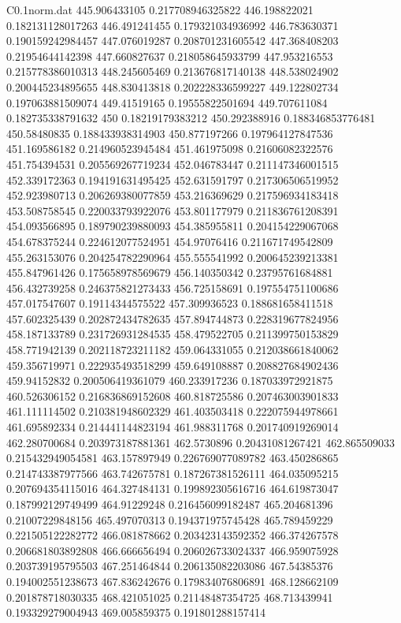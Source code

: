 \begin{filecontents}{C0.1norm.dat}
445.906433105		0.217708946325822
446.198822021		0.182131128017263
446.491241455		0.179321034936992
446.783630371		0.190159242984457
447.076019287		0.208701231605542
447.368408203		0.21954644142398
447.660827637		0.218058645933799
447.953216553		0.215778386010313
448.245605469		0.213676817140138
448.538024902		0.200445234895655
448.830413818		0.202228336599227
449.122802734		0.197063881509074
449.41519165		0.19555822501694
449.707611084		0.182735338791632
450		0.18219179383212
450.292388916		0.188346853776481
450.58480835		0.188433938314903
450.877197266		0.197964127847536
451.169586182		0.214960523945484
451.461975098		0.21606082322576
451.754394531		0.205569267719234
452.046783447		0.211147346001515
452.339172363		0.194191631495425
452.631591797		0.217306506519952
452.923980713		0.206269380077859
453.216369629		0.217596934183418
453.508758545		0.220033793922076
453.801177979		0.211836761208391
454.093566895		0.189790239880093
454.385955811		0.204154229067068
454.678375244		0.224612077524951
454.97076416		0.211671749542809
455.263153076		0.204254782290964
455.555541992		0.200645239213381
455.847961426		0.175658978569679
456.140350342		0.23795761684881
456.432739258		0.246375821273433
456.725158691		0.197554751100686
457.017547607		0.19114344575522
457.309936523		0.188681658411518
457.602325439		0.202872434782635
457.894744873		0.228319677824956
458.187133789		0.231726931284535
458.479522705		0.211399750153829
458.771942139		0.202118723211182
459.064331055		0.212038661840062
459.356719971		0.222935493518299
459.649108887		0.208827684902436
459.94152832		0.200506419361079
460.233917236		0.187033972921875
460.526306152		0.216836869152608
460.818725586		0.207463003901833
461.111114502		0.210381948602329
461.403503418		0.222075944978661
461.695892334		0.214441144823194
461.988311768		0.201740919269014
462.280700684		0.203973187881361
462.5730896		0.20431081267421
462.865509033		0.215432949054581
463.157897949		0.226769077089782
463.450286865		0.214743387977566
463.742675781		0.187267381526111
464.035095215		0.207694354115016
464.327484131		0.199892305616716
464.619873047		0.187992129749499
464.91229248		0.216456099182487
465.204681396		0.21007229848156
465.497070313		0.194371975745428
465.789459229		0.221505122282772
466.081878662		0.203423143592352
466.374267578		0.206681803892808
466.666656494		0.206026733024337
466.959075928		0.203739195795503
467.251464844		0.206135082203086
467.54385376		0.194002551238673
467.836242676		0.179834076806891
468.128662109		0.201878718030335
468.421051025		0.21148487354725
468.713439941		0.193329279004943
469.005859375		0.191801288157414

\end{filecontents}
